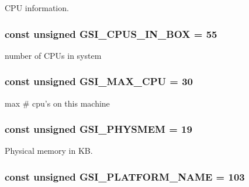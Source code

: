 CPU information. \hypertarget{classMipsLinux_a4df912c77419619f6f242873f65b0045}{
\subsubsection[{GSI\_\-CPUS\_\-IN\_\-BOX}]{\setlength{\rightskip}{0pt plus 5cm}const unsigned {\bf GSI\_\-CPUS\_\-IN\_\-BOX} = 55}}
\label{classMipsLinux_a4df912c77419619f6f242873f65b0045}


number of CPUs in system \hypertarget{classMipsLinux_a14ed8f49156face38fb0dee35125148d}{
\subsubsection[{GSI\_\-MAX\_\-CPU}]{\setlength{\rightskip}{0pt plus 5cm}const unsigned {\bf GSI\_\-MAX\_\-CPU} = 30}}
\label{classMipsLinux_a14ed8f49156face38fb0dee35125148d}


max \# cpu's on this machine \hypertarget{classMipsLinux_a2c859016d59653914527bcd85a154da4}{
\subsubsection[{GSI\_\-PHYSMEM}]{\setlength{\rightskip}{0pt plus 5cm}const unsigned {\bf GSI\_\-PHYSMEM} = 19}}
\label{classMipsLinux_a2c859016d59653914527bcd85a154da4}


Physical memory in KB. \hypertarget{classMipsLinux_ac2412600f242b3062b887ef0ec4b4908}{
\subsubsection[{GSI\_\-PLATFORM\_\-NAME}]{\setlength{\rightskip}{0pt plus 5cm}const unsigned {\bf GSI\_\-PLATFORM\_\-NAME} = 103}}
\label{classMipsLinux_ac2412600f242b3062b887ef0ec4b4908}


